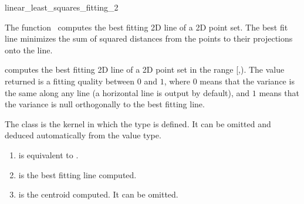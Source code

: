 
\begin{ccRefFunction}{linear_least_squares_fitting_2}  


\ccDefinition
  
The function \ccRefName\ computes the best fitting 2D line of a 2D
point set. The best fit line minimizes the sum of squared distances
from the points to their projections onto the line.


{ computes the best fitting 2D line of a 2D point set in the range
[,). The value returned is a fitting quality
between $0$ and $1$, where $0$ means that the variance is the same
along any line (a horizontal line is output by default), and $1$ means
that the variance is null orthogonally to the best fitting line. }

The class  is the kernel in which the type
 is defined. It can be omitted and
deduced automatically from the value type.


\begin{enumerate}
   \item  {} is equivalent to .
   \item  {} is the best fitting line computed.
   \item  {} is the centroid computed. 
          It can be omitted.
\end{enumerate}

\end{ccRefFunction}
